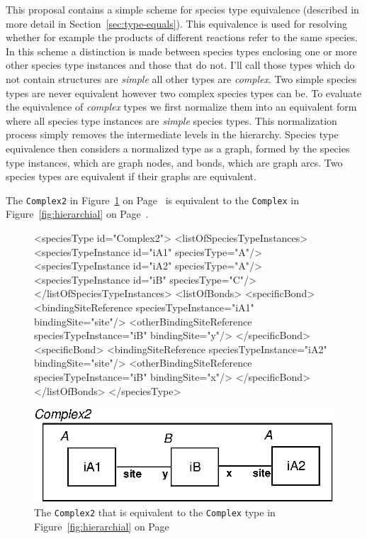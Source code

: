 \documentclass{cekarticle}
\begin{document}
This proposal contains a simple scheme for species type
equivalence (described in more detail in
Section~\ref{sec:type-equals}). This equivalence is used for
resolving whether for example the products of different reactions
refer to the same species. In this scheme a distinction is made
between species types enclosing one or more other species type
instances and those that do not.  I'll call those types which do
not contain  structures are
\emph{simple} all other types are \emph{complex}. Two simple
species types are never equivalent however two complex species
types can be. To evaluate the equivalence of \emph{complex} types
we first normalize them into an equivalent form where all species
type instances are \emph{simple} species types.  This
normalization process simply removes the intermediate levels in
the hierarchy. Species type equivalence then considers a
normalized type as a graph, formed by the species type instances,
which are graph nodes, and bonds, which are graph arcs. Two
species types are equivalent if their graphs are equivalent.

The \texttt{Complex2}  in Figure~\ref{fig:complex2} on Page~\pageref{fig:complex2} is
equivalent to the \texttt{Complex}  in Figure~\ref{fig:hierarchial} on
Page~\pageref{fig:hierarchial}.

\begin{figure}

\begin{example}
<speciesType id="Complex2">
    <listOfSpeciesTypeInstances>
        <speciesTypeInstance id="iA1" speciesType="A"/>
        <speciesTypeInstance id="iA2" speciesType="A"/>
        <speciesTypeInstance id="iB" speciesType="C"/>
    </listOfSpeciesTypeInstances>
    <listOfBonds>
        <specificBond>
            <bindingSiteReference speciesTypeInstance="iA1" bindingSite="site"/>
            <otherBindingSiteReference speciesTypeInstance="iB" bindingSite="y"/>
        </specificBond>
        <specificBond>
            <bindingSiteReference speciesTypeInstance="iA2" bindingSite="site"/>
            <otherBindingSiteReference speciesTypeInstance="iB" bindingSite="x"/>
        </specificBond>
    </listOfBonds>
</speciesType>
\end{example}
  \vspace*{8pt}
  \centering
  \includegraphics[scale = 0.7]{complex2.eps}
\caption{The \texttt{Complex2}  that is equivalent to the \texttt{Complex} type in
Figure~\ref{fig:hierarchial} on Page~\pageref{fig:hierarchial}}
\label{fig:complex2}
\end{figure}
\end{document}
